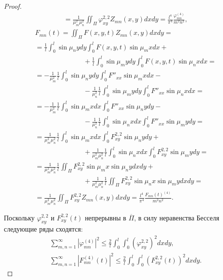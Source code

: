 \begin{proof}
\begin{multline}
=\frac{1}{\mu_m^2\mu_n^2}\iint_\Pi \varphi^{2,2}_{xy}Z_{mn}(x,y)dxdy
=\frac{l^4}{\pi^4}\frac{\varphi_{mn}^{(4)}}{m^2n^2},
\end{multline}
\begin{multline}
\label{a16}
F_{mn}(t)=\iint_\Pi F(x,y,t)Z_{mn}(x,y)dxdy= 
\\
=
\frac{1}{l}\int_0^l\sin\mu_nydy\int_0^lF(x,y,t)\sin\mu_mxdx+
\hspace{3cm}
\\
\hspace{3cm}
+\frac{1}{l}\int_0^l\sin\mu_mydy\int_0^lF(x,y,t)\sin\mu_nxdx=
\\
=
-\frac{1}{\mu_m^2}\frac{1}{l}\int_0^l\sin\mu_nydy\int_0^lF''_{xx}\sin\mu_mxdx-
\hspace{3cm}
\\
\hspace{3cm}
-\frac{1}{\mu_n^2}\frac{1}{l}\int_0^l\sin\mu_mydy\int_0^lF''_{xx}\sin\mu_nxdx=
\\
=
 -\frac{1}{\mu_m^2}\frac{1}{l}\int_0^l\sin\mu_mxdx\int_0^lF''_{xx}\sin\mu_nydy-
\hspace{3cm} 
 \\
\hspace{3cm} 
 -\frac{1}{\mu_n^2}\frac{1}{l}\int_0^l\sin\mu_nxdx\int_0^lF''_{xx}\sin\mu_mydy
=
\\ 
 =\frac{1}{\mu_m^2\mu_n^2}\frac{1}{l}\int_0^l\sin\mu_mxdx\int_0^lF^{2,2}_{xy}\sin\mu_nydy+
 \hspace{3cm}
\\
\hspace{3cm}
+\frac{1}{\mu_m^2\mu_n^2}\frac{1}{l}\int_0^l\sin\mu_nxdx\int_0^lF^{2,2}_{xy}\sin\mu_mydy=
\\
=
\frac{1}{\mu_m^2\mu_n^2}\frac{1}{l}\iint_\Pi F^{2,2}_{xy}\sin\mu_mx\sin\mu_nydxdy+
\hspace{3cm}
\\
\hspace{3cm}
+\frac{1}{\mu_m^2\mu_n^2}\frac{1}{l}\iint_\Pi F^{2,2}_{xy}\sin\mu_nx\sin\mu_mydxdy=
\\
=
\frac{1}{\mu_m^2\mu_n^2}\iint_\Pi F^{2,2}_{xy}Z_{mn}(x,y)dxdy=\frac{l^4}{\pi^4}\frac{F_{mn}(t)^{(4)}}{m^2n^2}.
\end{multline}

Поскольку $\varphi^{2,2}_{xy}$ и $F^{2,2}_{xy}(t)$ непрерывны в $\overline{\Pi}$, в силу неравенства Бесселя следующие ряды сходятся:
\begin{gather}
\label{a17}
\sum_{m,n=1}^{\infty}|\varphi^{(4)}_{mn}|^2\leqslant\frac{2}{l}\int_0^{l}\int_0^{l}(\varphi^{2,2}_{xy})^2dxdy, 
\\ 
\sum_{m,n=1}^{\infty}|F_{mn}^{(4)}(t)|^2\leqslant\frac{2}{l}\int_0^{l}\int_0^{l}(F^{2,2}_{xy}(t))^2dxdy.
\end{gather}


\end{proof}
